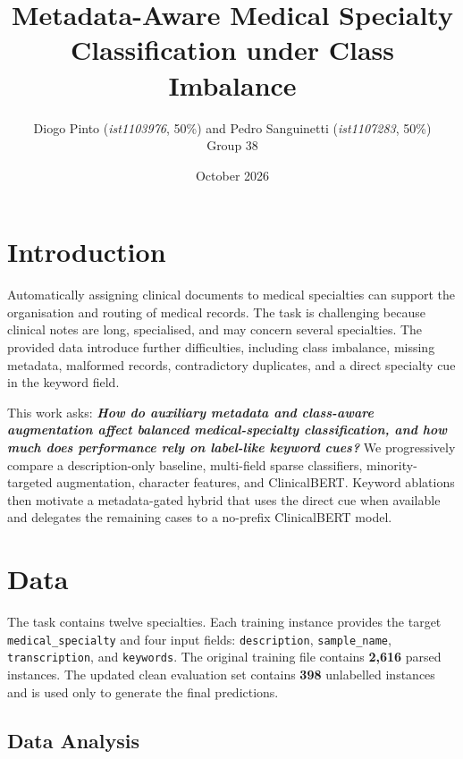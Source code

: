 \documentclass[twocolumn,10pt]{article}
\title{\vspace{-4.2cm}\textbf{Metadata-Aware Medical Specialty Classification under Class Imbalance}}
\author{\vspace{-0.2cm}
Diogo Pinto (\textit{ist1103976}, 50\%) and
Pedro Sanguinetti (\textit{ist1107283}, 50\%)\\Group 38
}
\affil{Instituto Superior Técnico, Universidade de Lisboa}
\date{\vspace{-0.3cm}October 2026}
\begin{document}
\raggedbottom

\maketitle
\vspace{-0.8cm}

\section*{\vspace{-0.4cm}Introduction}

Automatically assigning clinical documents to medical specialties can support the organisation and routing of medical records. The task is challenging because clinical notes are long, specialised, and may concern several specialties. The provided data introduce further difficulties, including class imbalance, missing metadata, malformed records, contradictory duplicates, and a direct specialty cue in the keyword field.

This work asks: \textbf{\textit{How do auxiliary metadata and class-aware augmentation affect balanced medical-specialty classification, and how much does performance rely on label-like keyword cues?}} We progressively compare a description-only baseline, multi-field sparse classifiers, minority-targeted augmentation, character features, and ClinicalBERT. Keyword ablations then motivate a metadata-gated hybrid that uses the direct cue when available and delegates the remaining cases to a no-prefix ClinicalBERT model.
\vspace{-0.9cm}

\section*{\vspace{-0.3cm}Data}

The task contains twelve specialties. Each training instance provides the target \texttt{medical\_specialty} and four input fields: \texttt{description}, \texttt{sample\_name}, \texttt{transcription}, and \texttt{keywords}. The original training file contains \textbf{2,616} parsed instances. The updated clean evaluation set contains \textbf{398} unlabelled instances and is used only to generate the final predictions.
\vspace{-0.4cm}

\subsection*{\vspace{-0.15cm}Data Analysis}
\end{document}

